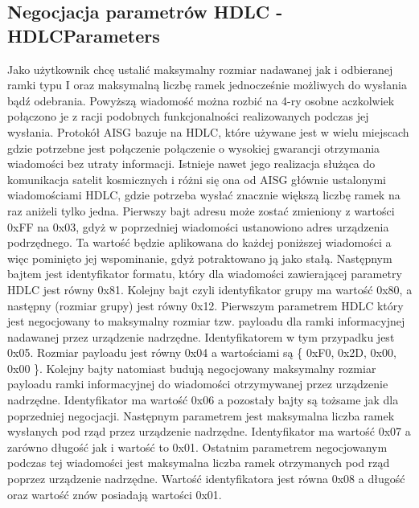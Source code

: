 		\subsection{Negocjacja parametrów HDLC - HDLCParameters}
			Jako użytkownik chcę ustalić maksymalny rozmiar nadawanej jak i odbieranej ramki typu I oraz maksymalną liczbę ramek jednocześnie możliwych do wysłania bądź odebrania.
			\newline\newline
			Powyższą wiadomość można rozbić na 4-ry osobne aczkolwiek połączono je z racji podobnych funkcjonalności realizowanych podczas jej wysłania. Protokół AISG bazuje na HDLC, które używane jest w wielu miejscach
			gdzie potrzebne jest połączenie połączenie o wysokiej gwarancji otrzymania wiadomości bez utraty informacji. Istnieje nawet jego realizacja służąca do komunikacja satelit kosmicznych i różni się ona od AISG głównie
			ustalonymi wiadomościami HDLC, gdzie potrzeba wysłać znacznie większą liczbę ramek na raz aniżeli tylko jedna.
			Pierwszy bajt adresu może zostać zmieniony z wartości 0xFF na 0x03, gdyż w poprzedniej wiadomości ustanowiono adres urządzenia podrzędnego. Ta wartość będzie aplikowana do każdej poniższej wiadomości a więc pominięto jej wspominanie,
			gdyż potraktowano ją jako stałą.
			\newline
			Następnym bajtem jest identyfikator formatu, który dla wiadomości zawierającej parametry HDLC jest równy 0x81.
			\newline
			Kolejny bajt czyli identyfikator grupy ma wartość 0x80, a następny (rozmiar grupy) jest równy 0x12.
			\newline
			Pierwszym parametrem HDLC który jest negocjowany to maksymalny rozmiar tzw. payloadu dla ramki informacyjnej nadawanej przez urządzenie nadrzędne. Identyfikatorem w tym przypadku jest 0x05. Rozmiar payloadu jest równy 0x04 a wartościami są \{ 0xF0, 0x2D, 0x00, 0x00 \}.
			\newline
			Kolejny bajty natomiast budują negocjowany maksymalny rozmiar payloadu ramki informacyjnej do wiadomości otrzymywanej przez urządzenie nadrzędne. Identyfikator ma wartość 0x06 a pozostały bajty są tożsame jak dla poprzedniej
			negocjacji.
			\newline
			Następnym parametrem jest maksymalna liczba ramek wysłanych pod rząd przez urządzenie nadrzędne. Identyfikator ma wartość 0x07 a zarówno długość jak i wartość to 0x01.
			\newline
			Ostatnim parametrem negocjowanym podczas tej wiadomości jest maksymalna liczba ramek otrzymanych pod rząd poprzez urządzenie nadrzędne. Wartość identyfikatora jest równa 0x08 a długość oraz wartość znów posiadają wartości 0x01.
